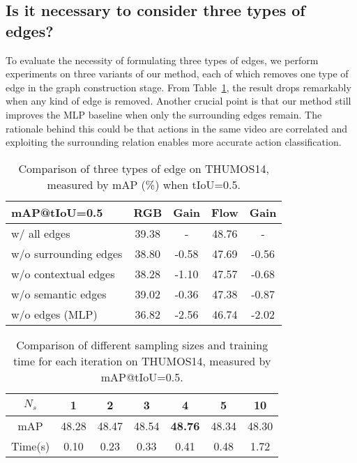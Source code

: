 \documentclass[10pt,journal,compsoc]{IEEEtran}
\begin{document}
	\subsection{Is it necessary to consider three types of edges?}
	
	To evaluate the necessity of formulating three types of edges, we perform experiments on three variants of our method, each of which removes one type of edge in the graph construction stage. From Table~\ref{Tab:surrounding}, the result drops remarkably when any kind of edge is removed. 
	Another crucial point is that our method still improves the MLP baseline when only the surrounding edges remain. The rationale behind this could be that actions in the same video are correlated and exploiting the surrounding relation enables more accurate action classification. 
	
	\begin{table}[!tb]
		\centering
		\caption{Comparison of three types of edge on THUMOS14, measured by mAP (\%) when tIoU=0.5.}
		\begin{tabular}{l|cc|cc}
			\hline
			mAP@tIoU=0.5                & RGB     & Gain      & Flow     & Gain        \\ \hline
			w/ all edges   & 39.38   & -       & 48.76  &  - \\
			w/o surrounding edges   & 38.80   & -0.58      & 47.69  & -0.56 \\ 
			w/o contextual edges   & 38.28   & -1.10      & 47.57   & -0.68 \\ 
			w/o semantic edges   & 39.02  & -0.36      & 47.38  & -0.87 \\ 
			w/o  edges (MLP)    & 36.82   &  -2.56    &  46.74     & -2.02 \\ \hline
		\end{tabular}
		\label{Tab:surrounding}
	\end{table}
	
	
	\begin{table}[!t]
	\centering
	\tabcolsep 5pt %
	\caption{Comparison of different sampling sizes and training time for each iteration on THUMOS14, measured by mAP@tIoU=0.5.}
	\vspace{0.1cm}
	\begin{tabular}{c|cccccc}
		\hline
		$N_s$  & 1 & 2 & 3 & 4 & 5 & 10 \\ \hline
		mAP & 48.28 & 48.47 & 48.54 & \textbf{48.76} & 48.34 & 48.30\\
		Time(s) & 0.10 & 0.23 & 0.33 & 0.41 & 0.48 & 1.72 \\ \hline
	\end{tabular}
	\label{Tab:sampling}
\end{table}
\end{document}

